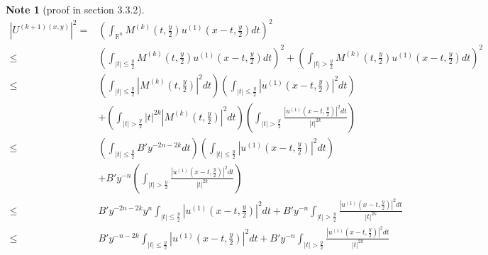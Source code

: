 \documentclass{report}
\theoremstyle{definition}
\newtheorem{note}{Note}
\theoremstyle{definition}
\theoremstyle{plain}
\numberwithin{theorem}{section}
\numberwithin{remark}{section}
\numberwithin{equation}{section}
\newcommand{\abs}[1]{\left\lvert#1\right\rvert}
\begin{document}
\begin{note}[proof in section 3.3.2]
    \begin{align*}
        \abs{U^{(k+1)(x,y)}}^2=&\left( \int_{\mathbb{R}^n}{M^{(k)}(t,\frac{y}{2})u^{(1)}(x-t,\frac{y}{2})dt} \right)^2\\
        \leq &\left( \int_{\abs{t}\leq\frac{y}{2}}{M^{(k)}(t,\frac{y}{2})u^{(1)}(x-t,\frac{y}{2})dt} \right)^2+\left( \int_{\abs{t}>\frac{y}{2}}{M^{(k)}(t,\frac{y}{2})u^{(1)}(x-t,\frac{y}{2})dt} \right)^2\\
        \leq &\left( \int_{\abs{t}\leq\frac{y}{2}}{\abs{M^{(k)}(t,\frac{y}{2})}^2dt} \right) \left( \int_{\abs{t}\leq\frac{y}{2}}{\abs{u^{(1)}(x-t,\frac{y}{2})}^2dt} \right)\\
         &+\left( \int_{\abs{t}>\frac{y}{2}}{\abs{t}^{2k}\abs{M^{(k)}(t,\frac{y}{2})}^2dt} \right)\left( \int_{\abs{t}>\frac{y}{2}}\frac{\abs{u^{(1)}(x-t,\frac{y}{2})}^2dt}{\abs{t}^{2k}} \right)\\
         \leq &\left( \int_{\abs{t}\leq\frac{y}{2}}{B'y^{-2n-2k}dt} \right) \left( \int_{\abs{t}\leq\frac{y}{2}}{\abs{u^{(1)}(x-t,\frac{y}{2})}^2dt} \right)\\
         &+B'y^{-n} \left( \int_{\abs{t}>\frac{y}{2}}\frac{\abs{u^{(1)}(x-t,\frac{y}{2})}^2dt}{\abs{t}^{2k}} \right)\\
         \leq & B'y^{-2n-2k} y^{n}  \int_{\abs{t}\leq\frac{y}{2}}{\abs{u^{(1)}(x-t,\frac{y}{2})}^2dt} +B'y^{-n}  \int_{\abs{t}>\frac{y}{2}}\frac{\abs{u^{(1)}(x-t,\frac{y}{2})}^2dt}{\abs{t}^{2k}} \\
         \leq & B'y^{-n-2k} \int_{\abs{t}\leq\frac{y}{2}}{\abs{u^{(1)}(x-t,\frac{y}{2})}^2dt}+B'y^{-n} \int_{\abs{t}>\frac{y}{2}}\frac{\abs{u^{(1)}(x-t,\frac{y}{2})}^2dt}{\abs{t}^{2k}} \\
    \end{align*}
\end{note}
\end{document}
